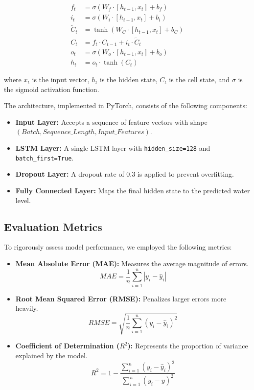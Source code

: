 \begin{equation}
    \begin{aligned}
        f_t &= \sigma(W_f \cdot [h_{t-1}, x_t] + b_f) \\
        i_t &= \sigma(W_i \cdot [h_{t-1}, x_t] + b_i) \\
        \tilde{C}_t &= \tanh(W_C \cdot [h_{t-1}, x_t] + b_C) \\
        C_t &= f_t \cdot C_{t-1} + i_t \cdot \tilde{C}_t \\
        o_t &= \sigma(W_o \cdot [h_{t-1}, x_t] + b_o) \\
        h_t &= o_t \cdot \tanh(C_t)
    \end{aligned}
\end{equation}

where $x_t$ is the input vector, $h_t$ is the hidden state, $C_t$ is the cell state, and $\sigma$ is the sigmoid activation function.

The architecture, implemented in PyTorch, consists of the following components:
\begin{itemize}
    \item \textbf{Input Layer:} Accepts a sequence of feature vectors with shape $(Batch, Sequence\_Length, Input\_Features)$.
    \item \textbf{LSTM Layer:} A single LSTM layer with \texttt{hidden\_size=128} and \texttt{batch\_first=True}.
    \item \textbf{Dropout Layer:} A dropout rate of $0.3$ is applied to prevent overfitting.
    \item \textbf{Fully Connected Layer:} Maps the final hidden state to the predicted water level.
\end{itemize}

\subsection{Evaluation Metrics}
To rigorously assess model performance, we employed the following metrics:

\begin{itemize}
    \item \textbf{Mean Absolute Error (MAE):} Measures the average magnitude of errors.
    \begin{equation}
        MAE = \frac{1}{n}\sum_{i=1}^{n}|y_i - \hat{y}_i|
    \end{equation}
    
    \item \textbf{Root Mean Squared Error (RMSE):} Penalizes larger errors more heavily.
    \begin{equation}
        RMSE = \sqrt{\frac{1}{n}\sum_{i=1}^{n}(y_i - \hat{y}_i)^2}
    \end{equation}
    
    \item \textbf{Coefficient of Determination ($R^2$):} Represents the proportion of variance explained by the model.
    \begin{equation}
        R^2 = 1 - \frac{\sum_{i=1}^{n}(y_i - \hat{y}_i)^2}{\sum_{i=1}^{n}(y_i - \bar{y})^2}
    \end{equation}
\end{itemize}


